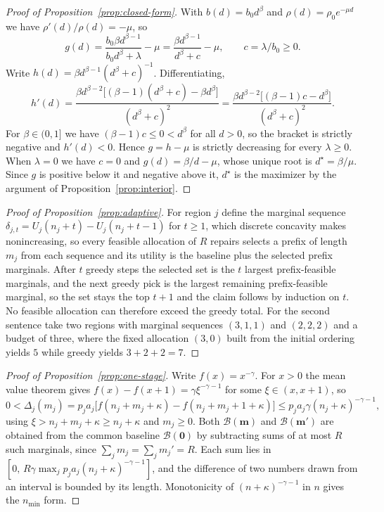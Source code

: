 \documentclass{article}
\begin{document}
\begin{proof}[Proof of Proposition~\ref{prop:closed-form}]
With $b(d)=b_0d^{\beta}$ and $\rho(d)=\rho_0e^{-\mu d}$ we have $\rho'(d)/\rho(d)=-\mu$, so
\[
g(d)=\frac{b_0\beta d^{\beta-1}}{b_0d^{\beta}+\lambda}-\mu=\frac{\beta d^{\beta-1}}{d^{\beta}+c}-\mu,\qquad c=\lambda/b_0\geq0.
\]
Write $h(d)=\beta d^{\beta-1}(d^{\beta}+c)^{-1}$. Differentiating,
\[
h'(d)=\frac{\beta d^{\beta-2}\bigl[(\beta-1)(d^{\beta}+c)-\beta d^{\beta}\bigr]}{(d^{\beta}+c)^{2}}=\frac{\beta d^{\beta-2}\bigl[(\beta-1)c-d^{\beta}\bigr]}{(d^{\beta}+c)^{2}}.
\]
For $\beta\in(0,1]$ we have $(\beta-1)c\leq0<d^{\beta}$ for all $d>0$, so the bracket is strictly negative and $h'(d)<0$. Hence $g=h-\mu$ is strictly decreasing for every $\lambda\geq0$. When $\lambda=0$ we have $c=0$ and $g(d)=\beta/d-\mu$, whose unique root is $d^{\star}=\beta/\mu$. Since $g$ is positive below it and negative above it, $d^{\star}$ is the maximizer by the argument of Proposition~\ref{prop:interior}.
\end{proof}

\begin{proof}[Proof of Proposition~\ref{prop:adaptive}]
For region $j$ define the marginal sequence $\delta_{j,t}=U_j(n_j+t)-U_j(n_j+t-1)$ for $t\geq1$, which discrete concavity makes nonincreasing, so every feasible allocation of $R$ repairs selects a prefix of length $m_j$ from each sequence and its utility is the baseline plus the selected prefix marginals. After $t$ greedy steps the selected set is the $t$ largest prefix-feasible marginals, and the next greedy pick is the largest remaining prefix-feasible marginal, so the set stays the top $t+1$ and the claim follows by induction on $t$. No feasible allocation can therefore exceed the greedy total. For the second sentence take two regions with marginal sequences $(3,1,1)$ and $(2,2,2)$ and a budget of three, where the fixed allocation $(3,0)$ built from the initial ordering yields $5$ while greedy yields $3+2+2=7$.
\end{proof}

\begin{proof}[Proof of Proposition~\ref{prop:one-stage}]
Write $f(x)=x^{-\gamma}$. For $x>0$ the mean value theorem gives $f(x)-f(x+1)=\gamma\xi^{-\gamma-1}$ for some $\xi\in(x,x+1)$, so
\[
0<\Delta_j(m_j)=p_ja_j\bigl[f(n_j+m_j+\kappa)-f(n_j+m_j+1+\kappa)\bigr]\leq p_ja_j\gamma(n_j+\kappa)^{-\gamma-1},
\]
using $\xi>n_j+m_j+\kappa\geq n_j+\kappa$ and $m_j\geq0$. Both $\mathcal B(\mathbf m)$ and $\mathcal B(\mathbf m')$ are obtained from the common baseline $\mathcal B(\mathbf 0)$ by subtracting sums of at most $R$ such marginals, since $\sum_jm_j=\sum_jm_j'=R$. Each sum lies in $[0,\,R\gamma\max_jp_ja_j(n_j+\kappa)^{-\gamma-1}]$, and the difference of two numbers drawn from an interval is bounded by its length. Monotonicity of $(n+\kappa)^{-\gamma-1}$ in $n$ gives the $n_{\min}$ form.
\end{proof}
\end{document}
